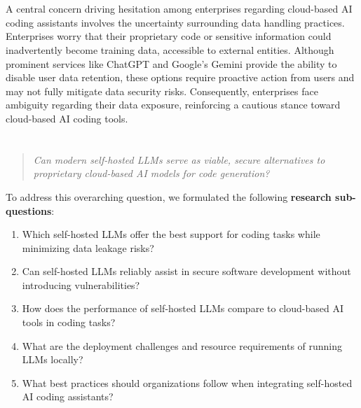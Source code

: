 \section{}%
\label{sec:probleemstelling}

A central concern driving hesitation among enterprises regarding cloud-based \gls{AI} coding assistants involves the uncertainty surrounding data handling practices. Enterprises worry that their proprietary code or sensitive information could inadvertently become training data, accessible to external entities. Although prominent services like ChatGPT and Google's Gemini provide the ability to disable user data retention, these options require proactive action from users and may not fully mitigate data security risks. Consequently, enterprises face ambiguity regarding their data exposure, reinforcing a cautious stance toward cloud-based \gls{AI} coding tools.

\section{}%
\label{sec:onderzoeksvraag}

\begin{quote}
    \textit{Can modern self-hosted LLMs serve as viable, secure alternatives to proprietary cloud-based \gls{AI} models for code generation?}
\end{quote}
\label{rq:main}

To address this overarching question, we formulated the following \textbf{research sub-questions}:

\begin{enumerate}[label=SQ\arabic*., ref=SQ\arabic*]
    \item \label{sq:best-choice} Which self-hosted \glspl{LLM} offer the best support for coding tasks while minimizing data leakage risks?
	\item \label{sq:secure-dev} Can self-hosted \glspl{LLM} reliably assist in secure software development without introducing vulnerabilities?
	\item \label{sq:performance} How does the performance of self-hosted \glspl{LLM} compare to cloud-based \gls{AI} tools in coding tasks?
	\item \label{sq:deployment} What are the deployment challenges and resource requirements of running \glspl{LLM} locally?
	\item \label{sq:best-practices} What best practices should organizations follow when integrating self-hosted \gls{AI} coding assistants?
\end{enumerate}

